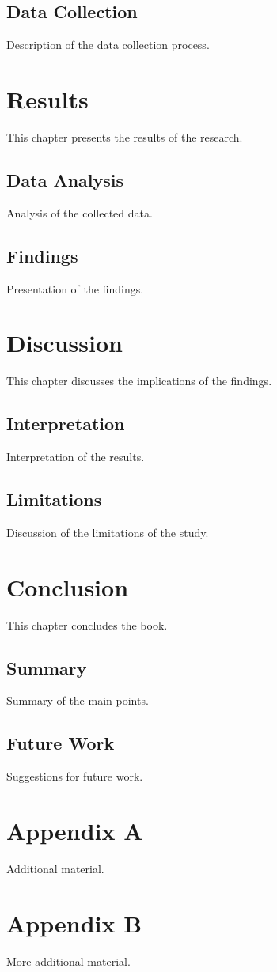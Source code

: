 \documentclass{book}
\begin{document}
\section{Data Collection}
Description of the data collection process.

\chapter{Results}
This chapter presents the results of the research.

\section{Data Analysis}
Analysis of the collected data.

\section{Findings}
Presentation of the findings.

\chapter{Discussion}
This chapter discusses the implications of the findings.

\section{Interpretation}
Interpretation of the results.

\section{Limitations}
Discussion of the limitations of the study.

\chapter{Conclusion}
This chapter concludes the book.

\section{Summary}
Summary of the main points.

\section{Future Work}
Suggestions for future work.

\appendix
\chapter{Appendix A}
Additional material.

\chapter{Appendix B}
More additional material.

\backmatter


\end{document}
